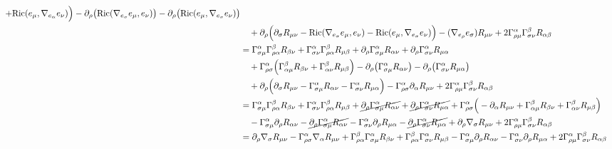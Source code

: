 \documentclass[a4paper,11pt]{article}
\numberwithin{equation}{section}
\theoremstyle{definition}
\newcommand{\R}{{\mathrm{Ric}}}
\begin{document}
\begin{align*}
    + \R( e_\mu ,\nabla_{e_\alpha}e_\nu )\Big)
    - \partial_\rho \big(\R(\nabla_{e_\sigma} e_\mu , e_\nu )\big)
    - \partial_\rho\big(\R(e_\mu , \nabla_{e_\sigma} e_\nu )\big)  \\
    & \quad + \partial_\rho \Big( \partial_\sigma R_{\mu\nu} 
    - \R(\nabla_{e_\sigma} e_\mu , e_\nu ) 
    - \R(e_\mu , \nabla_{e_\sigma} e_\nu )\Big)
    -(\nabla_{e_\rho} e_\sigma) R_{\mu\nu}  
    + 2 \Gamma_{\rho\mu}^\alpha \Gamma_{\sigma\nu}^\beta R_{\alpha\beta}\\
    &=\Gamma_{\sigma\mu}^\alpha\Gamma_{\rho\alpha}^\beta R_{\beta\nu}
    + \Gamma_{\sigma\nu}^\alpha\Gamma_{\rho\alpha}^\beta R_{\mu\beta}
    + \partial_\rho \Gamma_{\sigma\mu}^\alpha R_{\alpha\nu}
    + \partial_\rho\Gamma_{\sigma\nu}^\alpha R_{\mu\alpha} \\
    &\quad 
    + \Gamma_{\rho\sigma}^\alpha \Big(
    \Gamma_{\alpha\mu}^\beta R_{\beta\nu}
    + \Gamma_{\alpha\nu}^\beta R_{\mu\beta}\Big)
    - \partial_\rho \big(\Gamma_{\sigma\mu}^\alpha R_{\alpha\nu}\big)
    - \partial_\rho\big(\Gamma_{\sigma\nu}^\alpha R_{\mu\alpha}\big)  \\
    & \quad + \partial_\rho \Big( \partial_\sigma R_{\mu\nu} 
    - \Gamma_{\sigma\mu}^\alpha R_{\alpha\nu}
    - \Gamma_{\sigma\nu}^\alpha R_{\mu\alpha} \Big)
    -\Gamma_{\rho\sigma}^\alpha \partial_\alpha R_{\mu\nu}  
    + 2 \Gamma_{\rho\mu}^\alpha \Gamma_{\sigma\nu}^\beta R_{\alpha\beta}\\
    &=\Gamma_{\sigma\mu}^\alpha\Gamma_{\rho\alpha}^\beta R_{\beta\nu}
    + \Gamma_{\sigma\nu}^\alpha\Gamma_{\rho\alpha}^\beta R_{\mu\beta}
    + \cancel{\partial_\rho \Gamma_{\sigma\mu}^\alpha R_{\alpha\nu}}
    + \cancel{\partial_\rho\Gamma_{\sigma\nu}^\alpha R_{\mu\alpha}}
    + \Gamma_{\rho\sigma}^\alpha \Big(- \partial_\alpha R_{\mu\nu}
    + \Gamma_{\alpha\mu}^\beta R_{\beta\nu}
    + \Gamma_{\alpha\nu}^\beta R_{\mu\beta}\Big) \\
    &\quad 
    - \Gamma_{\sigma\mu}^\alpha \partial_\rho R_{\alpha\nu}
    - \cancel{\partial_\rho \Gamma_{\sigma\mu}^\alpha R_{\alpha\nu}}
    - \Gamma_{\sigma\nu}^\alpha \partial_\rho R_{\mu\alpha}
    - \cancel{\partial_\rho \Gamma_{\sigma\nu}^\alpha R_{\mu\alpha}}
    + \partial_\rho \nabla_\sigma R_{\mu\nu} 
    + 2 \Gamma_{\rho\mu}^\alpha \Gamma_{\sigma\nu}^\beta R_{\alpha\beta}\\
    &=\partial_\rho \nabla_\sigma R_{\mu\nu}
    - \Gamma_{\rho\sigma}^\alpha \nabla_\alpha R_{\mu\nu}
    + \Gamma_{\rho\alpha}^\beta \Gamma_{\sigma\mu}^\alpha R_{\beta\nu}
    + \Gamma_{\rho\alpha}^\beta \Gamma_{\sigma\nu}^\alpha R_{\mu\beta}
    - \Gamma_{\sigma\mu}^\alpha \partial_\rho R_{\alpha\nu}
    - \Gamma_{\sigma\nu}^\alpha \partial_\rho R_{\mu\alpha}
    + 2 \Gamma_{\rho\mu}^\alpha \Gamma_{\sigma\nu}^\beta R_{\alpha\beta}
\end{align*}
\end{document}
